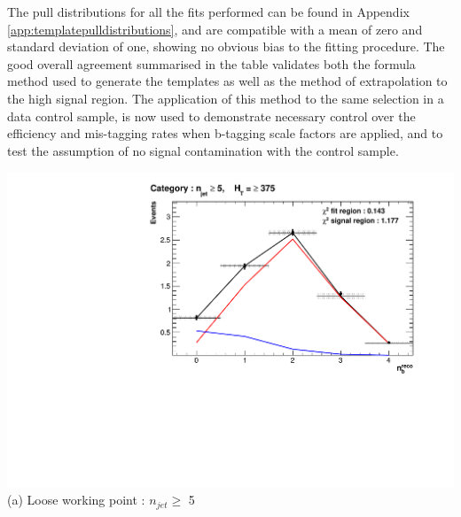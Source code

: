 The pull distributions for all the fits performed can be found in Appendix \ref{app:templatepulldistributions}, and are compatible with a mean of zero and standard deviation of one, showing no obvious bias to the fitting procedure. The good overall agreement summarised in the table validates both the formula method used to generate the templates as well as the method of extrapolation to the high \nbreco signal region. The application of this method to the same selection in a data control sample, is now used to demonstrate necessary control over the efficiency and mis-tagging rates when b-tagging scale factors are applied, and to test the assumption of no signal contamination with the \mupjets control sample.

\begin{minipage}{\linewidth}
\footnotesize
\vspace{5mm}
\centering
\begin{minipage}{.51\textwidth}
\centering
\includegraphics[width = 1.0\linewidth]{plots/ThesisPlots/Final_Fit_To_MC_Normal_Loose_HTBin_OneMuon_Template_375_jet_mult_5.pdf}
\centering (a) Loose working point : $n_{jet} \geq$  5 
\end{minipage}
\end{minipage}

\xspace

